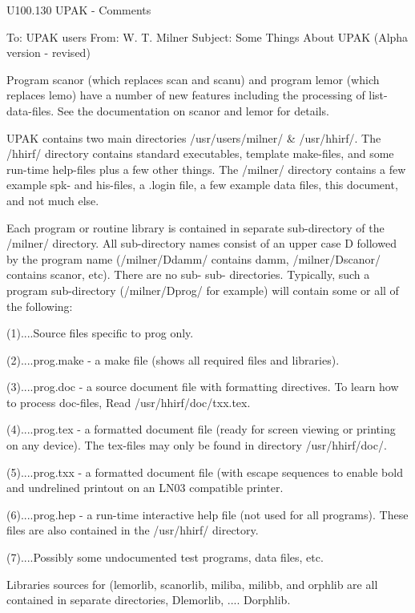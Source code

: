  
   U100.130  UPAK - Comments
 
   To:       UPAK users
   From:     W. T. Milner
   Subject:  Some Things About UPAK (Alpha version - revised)
 
   Program scanor (which replaces scan and scanu)  and  program  lemor  (which
   replaces  lemo)  have  a number of new features including the processing of
   list-data-files. See the documentation on scanor and lemor for details.
 
   UPAK contains two main directories /usr/users/milner/  &  /usr/hhirf/.  The
   /hhirf/  directory  contains standard executables, template make-files, and
   some run-time help-files plus a few other things.  The  /milner/  directory
   contains  a  few  example  spk- and his-files, a .login file, a few example
   data files, this document, and not much else.
 
   Each program or routine library is contained in separate  sub-directory  of
   the  /milner/ directory. All sub-directory names consist of an upper case D
   followed   by   the   program   name   (/milner/Ddamm/    contains    damm,
   /milner/Dscanor/  contains  scanor,  etc).   There   are   no   sub-   sub-
   directories.  Typically,  such  a program sub-directory (/milner/Dprog/ for
   example) will contain some or all of the following:
 
   (1)....Source files specific to prog only.
 
   (2)....prog.make - a make file (shows all required files and libraries).
 
   (3)....prog.doc - a source document file  with  formatting  directives.  To
          learn how to process doc-files, Read /usr/hhirf/doc/txx.tex.
 
   (4)....prog.tex  -  a  formatted document file (ready for screen viewing or
          printing on  any  device).  The  tex-files  may  only  be  found  in
          directory /usr/hhirf/doc/.
 
   (5)....prog.txx  -  a  formatted  document  file  (with escape sequences to
          enable bold and undrelined printout on an LN03 compatible printer.
 
   (6)....prog.hep - a run-time  interactive  help  file  (not  used  for  all
          programs).  These  files  are  also  contained  in  the  /usr/hhirf/
          directory.
 
   (7)....Possibly some undocumented test programs, data files, etc.
 
   Libraries sources for (lemorlib, scanorlib,  miliba,  milibb,  and  orphlib
   are all contained in separate directories, Dlemorlib, .... Dorphlib.
 
